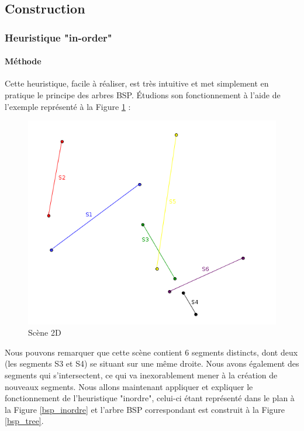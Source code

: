 \documentclass[11pt,a4paper]{article}
\begin{document}
\subsection{Construction}
\subsubsection{Heuristique "in-order"}

\paragraph{Méthode}

Cette heuristique, facile à réaliser, est très intuitive et met simplement en pratique le principe des arbres BSP. Étudions son fonctionnement à l'aide de l'exemple représenté à la Figure \ref{scene_inordre} : 

\begin{figure}[!h]
\centering
\includegraphics[scale=0.6]{bsp_ex_1.png}
\caption{Scène 2D}
\label{scene_inordre}
\end{figure}

Nous pouvons remarquer que cette scène contient 6 segments distincts, dont deux (les segments S3 et S4) se situant sur une même droite. Nous avons également des segments qui s'intersectent, ce qui va inexorablement mener à la création de nouveaux segments. Nous allons maintenant appliquer et expliquer le fonctionnement de l'heuristique "inordre", celui-ci étant représenté dans le plan à la Figure \ref{bsp_inordre} et l'arbre BSP correspondant est construit à la Figure \ref{bsp_tree}. \\
\end{document}
